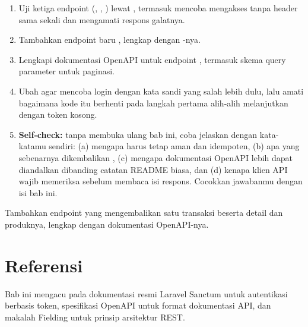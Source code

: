 \begin{enumerate}
  \item Uji ketiga endpoint (, ,
    ) lewat , termasuk mencoba mengakses
     tanpa header  sama
    sekali dan mengamati respons galatnya.
  \item Tambahkan endpoint baru , lengkap
    dengan -nya.
  \item Lengkapi dokumentasi OpenAPI untuk endpoint
    , termasuk skema query parameter untuk
    paginasi.
  \item Ubah  agar mencoba login dengan
    kata sandi yang salah lebih dulu, lalu amati bagaimana kode itu
    berhenti pada langkah pertama alih-alih melanjutkan dengan token
    kosong.
  \item \textbf{Self-check:} tanpa membuka ulang bab ini, coba jelaskan
    dengan kata-katamu sendiri: (a) mengapa  harus tetap
    aman dan idempoten, (b) apa yang sebenarnya dikembalikan
    , (c) mengapa dokumentasi OpenAPI lebih
    dapat diandalkan dibanding catatan README biasa, dan (d) kenapa
    klien API wajib memeriksa  sebelum membaca isi
    respons. Cocokkan jawabanmu dengan isi bab ini.
\end{enumerate}

\begin{challengebox}
Tambahkan endpoint  yang
mengembalikan satu transaksi beserta detail dan produknya, lengkap
dengan dokumentasi OpenAPI-nya.
\end{challengebox}

\section{Referensi}

Bab ini mengacu pada dokumentasi resmi Laravel Sanctum
\cite{sanctumdocs} untuk autentikasi berbasis token, spesifikasi
OpenAPI \cite{openapispec} untuk format dokumentasi API, dan makalah
Fielding \cite{fielding2000rest} untuk prinsip arsitektur REST.
